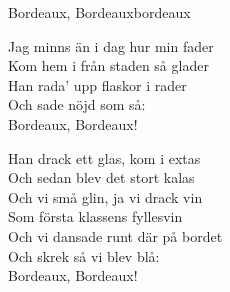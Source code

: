 \begin{song}{Bordeaux, Bordeaux}{bordeaux}
\begin{vers}
Jag minns än i dag hur min fader\\
Kom hem i från staden så glader\\
Han rada' upp flaskor i rader\\
Och sade nöjd som så:\\
Bordeaux, Bordeaux!\\
\end{vers}
\begin{vers}
Han drack ett glas, kom i extas\\
Och sedan blev det stort kalas\\
Och vi små glin, ja vi drack vin\\
Som första klassens fyllesvin\\
Och vi dansade runt där på bordet\\
Och skrek så vi blev blå:\\
Bordeaux, Bordeaux!\\
\end{vers}
\end{song}

